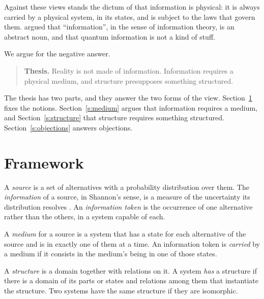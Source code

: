 \documentclass{situationist-preprint}
\begin{document}
Against these views stands the dictum of \citet{Landauer1991} that information is physical: it is always carried by a physical system, in its states, and is subject to the laws that govern them. \citet{Timpson2013} argued that \enquote{information}, in the sense of information theory, is an abstract noun, and that quantum information is not a kind of stuff.

We argue for the negative answer.

\begin{quote}
\textbf{Thesis.} Reality is not made of information. Information requires a physical medium, and structure presupposes something structured.
\end{quote}

The thesis has two parts, and they answer the two forms of the view. Section~\ref{s:framework} fixes the notions. Section~\ref{s:medium} argues that information requires a medium, and Section~\ref{s:structure} that structure requires something structured. Section~\ref{s:objections} answers objections.

\section{Framework}\label{s:framework}

\begin{definition}[Information]\label{d:info}
A \emph{source} is a set of alternatives with a probability distribution over them. The \emph{information} of a source, in Shannon's sense, is a measure of the uncertainty its distribution resolves \citep{Shannon1948}. An \emph{information token} is the occurrence of one alternative rather than the others, in a system capable of each.
\end{definition}

\begin{definition}[Medium]\label{d:medium}
A \emph{medium} for a source is a system that has a state for each alternative of the source and is in exactly one of them at a time. An information token is \emph{carried} by a medium if it consists in the medium's being in one of those states.
\end{definition}

\begin{definition}[Structure]\label{d:structure}
A \emph{structure} is a domain together with relations on it. A system \emph{has} a structure if there is a domain of its parts or states and relations among them that instantiate the structure. Two systems have the same structure if they are isomorphic.
\end{definition}
\end{document}
